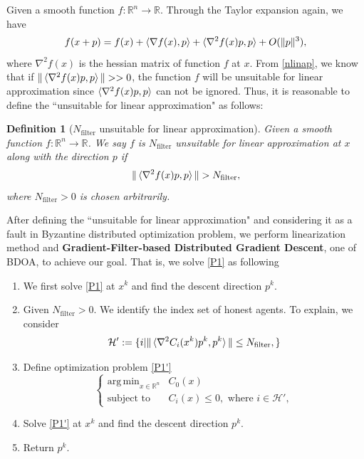 \documentclass[conference]{IEEEtran}
\newtheorem{definition}{Definition}
\DeclareMathOperator*{\argmin}{arg\,min}
\begin{document}
Given a smooth function $f:\mathbb{R}^n \rightarrow \mathbb{R}$. Through the Taylor expansion again, we have
\begin{equation}
    f(x+p) =  f(x) + \braket{\nabla f(x), p} + \braket{\nabla^2 f(x) p, p} + O(\|p\|^3),\label{nlinap}
\end{equation}
where $\nabla^2 f(x)$ is the hessian matrix of function $f$ at $x$. From \eqref{nlinap}, we know that if $\|\braket{\nabla^2 f(x) p, p}\| >> 0$, the function $f$ will be unsuitable for linear approximation since $\braket{\nabla^2 f(x) p, p}$ can not be ignored. Thus, it is reasonable to define the ``unsuitable for linear approximation" as follows:
\begin{definition}[$N_{\text{filter}}$ unsuitable for linear approximation]
    Given a smooth function $f:\mathbb{R}^n \rightarrow \mathbb{R}$. We say $f$ is $N_{\text{filter}}$ unsuitable for linear approximation at $x$ along with the direction $p$ if 
    \begin{equation}
        \|\braket{\nabla^2 f(x) p, p}\| > N_{\text{filter}},
        \label{unlinap}
    \end{equation}
    where $N_{\text{filter}}>0$ is chosen arbitrarily. 
\end{definition}

After defining the ``unsuitable for linear approximation" and considering it as a fault in Byzantine distributed optimization problem, we perform linearization method and \textbf{Gradient-Filter-based Distributed Gradient Descent}, one of BDOA, to achieve our goal. That is, we solve \eqref{P1} as following
\begin{enumerate}
    \item We first solve \eqref{P1} at $x^k$ and find the descent direction $p^k$.
    \item Given $N_{\text{filter}}>0$. We identify the index set of honest agents. To explain, we consider
    \begin{equation}
        \mathcal{H'}:=\{i|\|\braket{\nabla^2 C_i(x^k) p^k, p^k}\| \leq N_{\text{filter}},\}
    \end{equation}
    \item Define optimization problem \eqref{P1'}
    \begin{equation}
        \tag{P1'}
        \begin{cases}
        \argmin_{x\in \mathbb{R}^n} &C_0(x)\\
        \text{subject to} &C_i(x) \leq 0, \text{ where } i \in \mathcal{H'},
        \end{cases}
        \label{P1'}
    \end{equation}
    \item Solve \eqref{P1'} at $x^k$ and find the descent direction $p^k$.
    \item Return $p^k$.
\end{enumerate}
\end{document}
